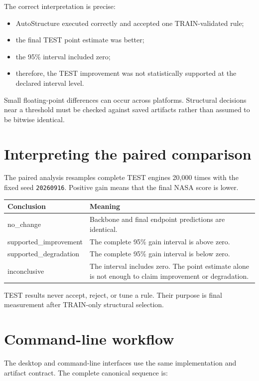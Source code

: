 \documentclass[11pt,a4paper]{article}
\begin{document}
The correct interpretation is precise:

\begin{itemize}
  \item AutoStructure executed correctly and accepted one TRAIN-validated rule;
  \item the final TEST point estimate was better;
  \item the 95\% interval included zero;
  \item therefore, the TEST improvement was not statistically supported at the
  declared interval level.
\end{itemize}

Small floating-point differences can occur across platforms. Structural
decisions near a threshold must be checked against saved artifacts rather than
assumed to be bitwise identical.

\section{Interpreting the paired comparison}

The paired analysis resamples complete TEST engines 20,000 times with the fixed
seed \texttt{20260916}. Positive gain means that the final NASA score is lower.

\begin{tabularx}{\textwidth}{>{\ttfamily}p{} X}
\toprule
\normalfont\bfseries Conclusion & \bfseries Meaning \\
\midrule
no\_change & Backbone and final endpoint predictions are identical. \\
supported\_improvement & The complete 95\% gain interval is above zero. \\
supported\_degradation & The complete 95\% gain interval is below zero. \\
inconclusive & The interval includes zero. The point estimate alone is not
enough to claim improvement or degradation. \\
\bottomrule
\end{tabularx}

TEST results never accept, reject, or tune a rule. Their purpose is final
measurement after TRAIN-only structural selection.

\section{Command-line workflow}

The desktop and command-line interfaces use the same implementation and artifact
contract. The complete canonical sequence is:
\end{document}
